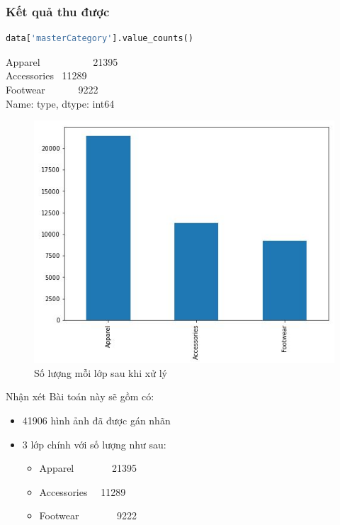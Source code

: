 \subsubsection{Kết quả thu được}
\begin{lstlisting}[language = python]
data['masterCategory'].value_counts()
\end{lstlisting}
Apparel    \ \ \ \ \ \ \ \ \ \ 21395\\
Accessories \   11289\\
Footwear    \ \ \ \ \ \  9222\\
Name: type, dtype: int64
\newpage
\begin{center}
    \begin{figure}[!h]
        \centering
        \includegraphics[scale = 1.5]{fileanh/5.jpg}
        \caption{Số lượng mỗi lớp sau khi xử lý}
    \end{figure}
\end{center}

\begin{block}{Nhận xét}
Bài toán này sẽ gồm có:
\begin{itemize}
    \item 41906 hình ảnh đã được gán nhãn 
    \item 3 lớp chính với số lượng như sau:
    \begin{itemize}
        \item Apparel \ \ \ \ \ \ \ 21395
        \item Accessories \ \ 11289
        \item Footwear \ \ \ \ \ \ \ 9222
    \end{itemize}
\end{itemize}
\end{block}
\newpage
